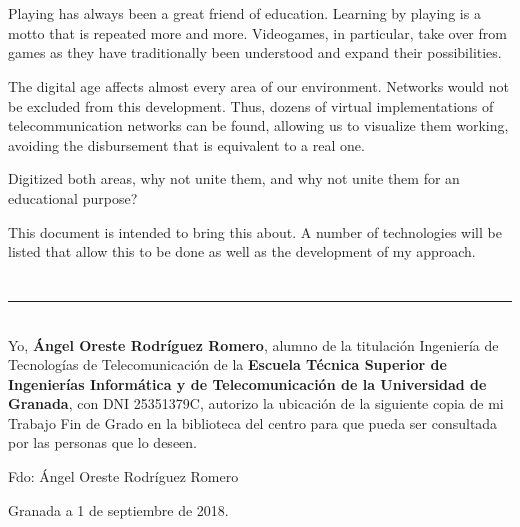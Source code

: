 \\

\vspace{0.7cm}
\\

Playing has always been a great friend of education. Learning by playing is a motto that is repeated more and more. Videogames, in particular, take over from games as they have traditionally been understood and expand their possibilities.

The digital age affects almost every area of our environment. Networks would not be excluded from this development. Thus, dozens of virtual implementations of telecommunication networks can be found, allowing us to visualize them working, avoiding the disbursement that is equivalent to a real one.

Digitized both areas, why not unite them, and why not unite them for an educational purpose?

This document is intended to bring this about. A number of technologies will be listed that allow this to be done as well as the development of my approach.

\chapter*{}
\thispagestyle{empty}

\noindent\rule[-1ex]{\textwidth}{2pt}\\[4.5ex]

Yo, \textbf{Ángel Oreste Rodríguez Romero}, alumno de la titulación Ingeniería de Tecnologías de Telecomunicación de la \textbf{Escuela Técnica Superior
de Ingenierías Informática y de Telecomunicación de la Universidad de Granada}, con DNI 25351379C, autorizo la
ubicación de la siguiente copia de mi Trabajo Fin de Grado en la biblioteca del centro para que pueda ser
consultada por las personas que lo deseen.

\vspace{6cm}

\noindent Fdo: Ángel Oreste Rodríguez Romero

\vspace{2cm}

\begin{flushright}
Granada a 1 de septiembre de 2018.
\end{flushright}


